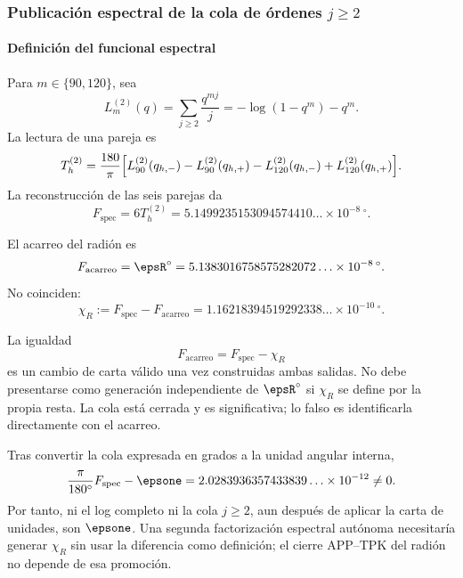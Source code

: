 \subsubsection{Publicación espectral de la cola de órdenes \(j\ge2\)}

\paragraph{Definición del funcional espectral}

Para \(m\in\{90,120\}\), sea
\begin{equation}
L_m^{(2)}(q)=\sum_{j\ge2}\frac{q^{mj}}{j}
=-\log(1-q^m)-q^m.
\label{eq:L2}
\end{equation}
La lectura de una pareja es
\begin{equation}
T_h^{(2)}=\frac{180}{\pi}
\Bigl[
L_{90}^{(2)}(q_{h,-})-L_{90}^{(2)}(q_{h,+})
-L_{120}^{(2)}(q_{h,-})+L_{120}^{(2)}(q_{h,+})
\Bigr].
\label{eq:T-h}
\end{equation}
La reconstrucción de las seis parejas da
\begin{equation}
F_{\mathrm{spec}}=6T_h^{(2)}
=5.1499235153094574410\ldots\times10^{-8}\,{}^\circ.
\label{eq:Fspec}
\end{equation}

El acarreo del radión es
\[
F_{\mathrm{acarreo}}=\epsR^\circ
=5.1383016758575282072\ldots\times10^{-8}\,{}^\circ.
\]
No coinciden:
\begin{equation}
\chi_R:=F_{\mathrm{spec}}-F_{\mathrm{acarreo}}
=1.16218394519292338\ldots\times10^{-10}\,{}^\circ.
\label{eq:chiR}
\end{equation}

La igualdad
\[
F_{\mathrm{acarreo}}=F_{\mathrm{spec}}-\chi_R
\]
es un cambio de carta válido una vez construidas ambas salidas. No debe
presentarse como generación independiente de \(\epsR^\circ\) si \(\chi_R\) se
define por la propia resta. La cola está cerrada y es significativa; lo falso
es identificarla directamente con el acarreo.

\begin{falsifier}
Tras convertir la cola expresada en grados a la unidad angular interna,
\[
\frac{\pi}{180^\circ}F_{\mathrm{spec}}-\epsone
=2.0283936357433839\ldots\times10^{-12}\ne0.
\]
Por tanto, ni el log completo ni la cola \(j\ge2\), aun después de aplicar la
carta de unidades, son \(\epsone\). Una
segunda factorización espectral autónoma necesitaría generar \(\chi_R\) sin
usar la diferencia como definición; el cierre APP--TPK del radión no depende
de esa promoción.
\end{falsifier}

